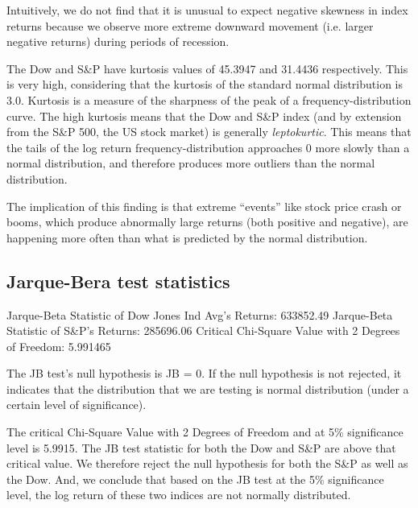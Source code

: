 \documentclass[a4paper]{article}
\begin{document}
Intuitively, we do not find that it is unusual to expect negative skewness in index returns because we observe more extreme downward movement (i.e. larger negative returns) during periods of recession.

The Dow and S\&P have kurtosis values of 45.3947 and 31.4436 respectively. This is very high, considering that the kurtosis of the standard normal distribution is 3.0. Kurtosis is a measure of the sharpness of the peak of a frequency-distribution curve. The high kurtosis means that the Dow and S\&P index (and by extension from the S\&P 500, the US stock market) is generally \textit{leptokurtic}. This means that the tails of the log return frequency-distribution approaches 0 more slowly than a normal distribution, and therefore produces more outliers than the normal distribution. 

The implication of this finding is that extreme “events” like stock price crash or booms, which produce abnormally large returns (both positive and negative), are happening more often than what is predicted by the normal distribution.


\subsection{Jarque-Bera test statistics}
\begin{flushleft}
Jarque-Beta Statistic of Dow Jones Ind Avg's Returns: 633852.49\linebreak
Jarque-Beta Statistic of S\&P's Returns: 285696.06\linebreak
Critical Chi-Square Value with 2 Degrees of Freedom: 5.991465\linebreak
\end{flushleft}
\vspace{-5mm}
The JB test’s null hypothesis is JB = 0. If the null hypothesis is not rejected, it indicates that the distribution that we are testing is normal distribution (under a certain level of significance).  

The critical Chi-Square Value with 2 Degrees of Freedom and at 5\% significance level is 5.9915. The JB test statistic for both the Dow and S\&P are above that critical value. We therefore reject the null hypothesis for both the S\&P as well as the Dow. And, we conclude that based on the JB test at the 5\% significance level, the log return of these two indices are not normally distributed.
\end{document}
